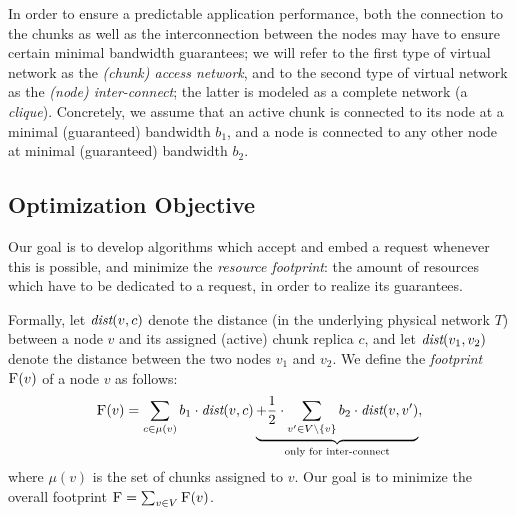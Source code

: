 \documentclass[preprint,12pt]{elsarticle}
\newcommand{\stefan}[1]{\textcolor{blue}{stefan: #1}}
\newcommand{\VirtualNodes}{\ensuremath{V}}
\newcommand{\achunk}{\ensuremath{c}}
\newcommand{\dist}{\emph{dist}}
\newcommand{\Cost}{\textsc{F}}
\newcommand{\Tree}{\ensuremath{T}}
\newcommand{\CostTrans}{\ensuremath{b_1}}
\newcommand{\CostCom}{\ensuremath{b_2}}
\begin{document}
In order to ensure a predictable application performance, both the connection to the chunks
as well as the interconnection between the nodes may have to ensure certain
minimal bandwidth guarantees; we will refer to the first type of virtual network as the \emph{(chunk) access
network}, and to the second type of virtual network as the \emph{(node) inter-connect}; the latter
is modeled as a complete network (a \emph{clique}). Concretely, we assume that an  active chunk
is connected to its node at a minimal (guaranteed) bandwidth $\CostTrans$, and a node is connected to any other node
at minimal (guaranteed) bandwidth $\CostCom$.




\subsection{Optimization Objective}

Our goal is to develop algorithms which 
accept and embed a request
whenever this is possible, and minimize the \emph{resource footprint}: the amount of resources which have to be dedicated to a request, in order to realize its guarantees.

Formally, let $\dist(v,\achunk)$ denote the distance (in the underlying physical network $\Tree$) between a node $v$ and
its assigned (active) chunk replica $\achunk$, and let $\dist(v_1,v_2)$ denote the distance between the two nodes $v_1$ and $v_2$.
We define the \emph{footprint} $\Cost(v)$ of a node $v$ as follows:
$$
\Cost(v) = \sum_{\achunk\in \mu(v)} \CostTrans \cdot \dist(v,\achunk) \underbrace{+ \frac{1}{2} \cdot \sum_{v' \in \VirtualNodes\setminus\{v\}} \CostCom \cdot \dist(v,v')}_{\text{only for inter-connect}},
$$
 where $\mu(v)$ is the set of chunks assigned to $v$. Our goal is to minimize the overall footprint
$\Cost=\sum_{v\in V} \Cost(v)$.
\end{document}

